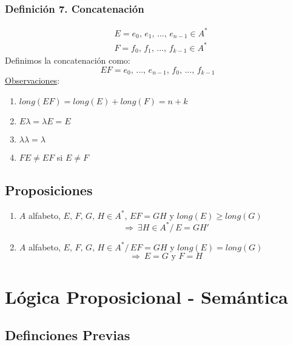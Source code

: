 \documentclass{article}
\newcommand{\comma}{,\,}                                %
\newcommand{\tq}{/\,}                                   %
\newcommand{\Rightarrows}{\: \Rightarrow \:}            %
\begin{document}
\subsubsection*{Definición 7. Concatenación}
\begin{align*}
    &E = e_0\comma e_1 \comma ...\comma e_{n-1} \in A^*\\
    &F = f_0\comma f_1 \comma ...\comma f_{k-1} \in A^*
\end{align*}
Definimos la concatenación como:
\begin{equation*}
	EF = e_0 \comma ... \comma e_{n-1} \comma f_0 \comma ... \comma f_{k-1}
\end{equation*}
\underline{Observaciones}:
\begin{enumerate}
	\item $long(EF) = long(E) + long(F) = n + k$
	\item $E\lambda = \lambda E = E$
	\item $\lambda \lambda = \lambda$
	\item $FE \neq EF$ si $E \neq F$
\end{enumerate}


\subsection{Proposiciones}
\begin{enumerate}
	\item $A$ alfabeto, $E\comma F \comma G \comma H \in A^*$, $EF = GH$ y $long(E) \geq long(G)$ 
	\begin{equation*}
	    \Rightarrows \exists H \in A^* \tq E = GH'
	\end{equation*}
		
	\item $A$ alfabeto, $E\comma F \comma G \comma H \in A^* \tq EF = GH$ y $long(E) = long(G)$
	\begin{equation*}
		\Rightarrows E = G \text{ y } F = H
	\end{equation*}
\end{enumerate}

\newpage
\section{Lógica Proposicional - Semántica}
\subsection{Definciones Previas}
\end{document}
